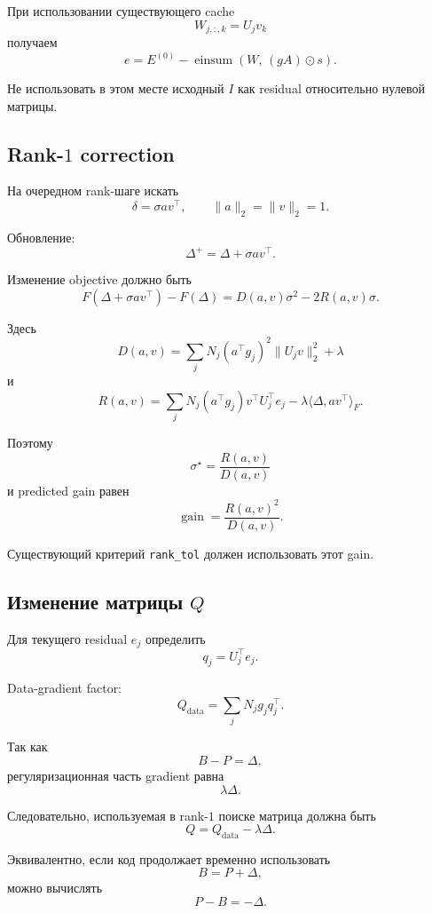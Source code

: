 При использовании существующего cache
\[
    W_{j,:,k}=U_jv_k
\]
получаем
\[
\boxed{
    e
    =
    E^{(0)}
    -
    \operatorname{einsum}
    \left(
        W,\,
        (gA)\odot s
    \right).
}
\]

Не использовать в этом месте исходный $I$ как residual относительно
нулевой матрицы.

\subsection{Rank-$1$ correction}

На очередном rank-шаге искать
\[
    \delta
    =
    \sigma av^\top,
    \qquad
    \|a\|_2=\|v\|_2=1.
\]

Обновление:
\[
    \Delta^+
    =
    \Delta+\sigma av^\top.
\]

Изменение objective должно быть
\[
\boxed{
    F(\Delta+\sigma av^\top)-F(\Delta)
    =
    D(a,v)\sigma^2
    -
    2R(a,v)\sigma.
}
\]

Здесь
\[
\boxed{
    D(a,v)
    =
    \sum_j
    N_j
    (a^\top g_j)^2
    \|U_jv\|_2^2
    +
    \lambda
}
\]
и
\[
\boxed{
    R(a,v)
    =
    \sum_j
    N_j
    (a^\top g_j)
    v^\top U_j^\top e_j
    -
    \lambda
    \langle
        \Delta,av^\top
    \rangle_F.
}
\]

Поэтому
\[
\boxed{
    \sigma^\star
    =
    \frac{R(a,v)}{D(a,v)}
}
\]
и predicted gain равен
\[
\boxed{
    \operatorname{gain}
    =
    \frac{R(a,v)^2}{D(a,v)}.
}
\]

Существующий критерий \texttt{rank\_tol} должен использовать этот gain.

\subsection{Изменение матрицы $Q$}

Для текущего residual $e_j$ определить
\[
    q_j
    =
    U_j^\top e_j.
\]

Data-gradient factor:
\[
    Q_{\mathrm{data}}
    =
    \sum_j
    N_jg_jq_j^\top.
\]

Так как
\[
    B-P=\Delta,
\]
регуляризационная часть gradient равна
\[
    \lambda\Delta.
\]

Следовательно, используемая в rank-$1$ поиске матрица должна быть
\[
\boxed{
    Q
    =
    Q_{\mathrm{data}}
    -
    \lambda\Delta.
}
\]

Эквивалентно, если код продолжает временно использовать
\[
    B=P+\Delta,
\]
можно вычислять
\[
    P-B=-\Delta.
\]

